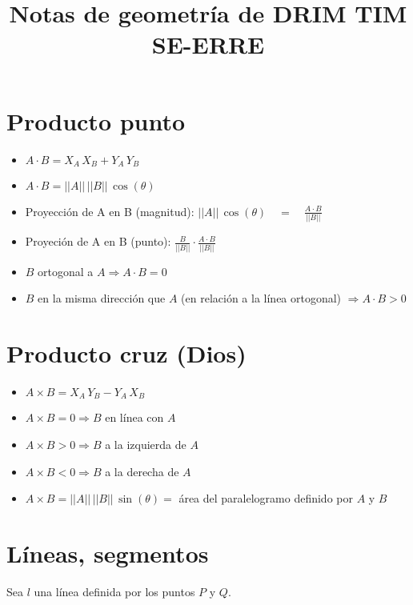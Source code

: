 
\title{Notas de geometr\'ia de DRIM TIM SE-ERRE}
\date{}

\maketitle

\section {Producto punto}
\begin{itemize}
\item $ A \cdot B = X_A \, X_B + Y_A \, Y_B $
\item $A \cdot B = ||A||\, ||B||\, \cos(\theta)$
\item Proyecci\'on de A en B (magnitud): $||A||\, \cos(\theta) \quad = \quad \frac{A \cdot B }{ ||B||} $
\item Proyeci\'on de A en B (punto): $\frac{B}{||B||} \cdot \frac{A \cdot B }{ ||B||} $
\item $B$ ortogonal a $A \Rightarrow A\cdot B = 0$ 
\item $B$ en la misma direcci\'on que $A$ (en relaci\'on a la l\'inea ortogonal) $\Rightarrow A\cdot B > 0$
\end{itemize}

\section {Producto cruz (Dios)}
\begin{itemize}
\item $A \times B = X_A \, Y_B - Y_A \, X_B$
\item $A \times B = 0 \Rightarrow B$ en l\'inea con $A$
\item $A \times B > 0 \Rightarrow B$ a la izquierda de $A$
\item $A \times B < 0 \Rightarrow B$ a la derecha de $A$
\item $A \times B = ||A|| \, ||B|| \, \sin(\theta) = $ \'area del paralelogramo definido por $A$ y $B$
\end{itemize}

\section{L\'ineas, segmentos}
Sea $l$ una l\'inea definida por los puntos $P$ y $Q$.
